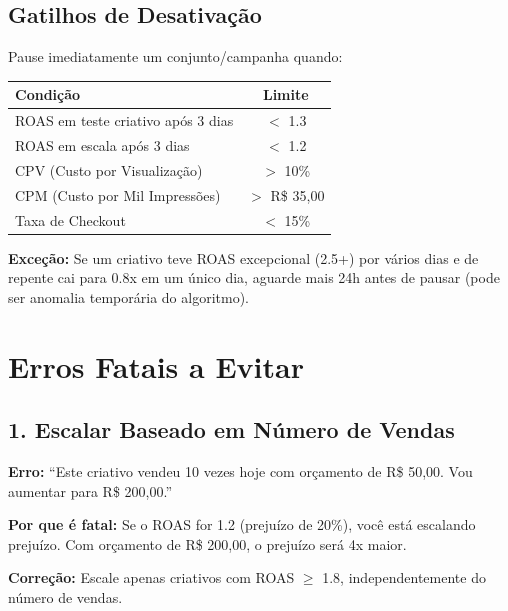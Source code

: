 \documentclass[12pt, a4paper]{article}
\newcommand{\reais}[1]{R\$ #1}
\begin{document}
\pagebreak

\subsection{Gatilhos de Desativação}

Pause imediatamente um conjunto/campanha quando:

\begin{table}[H]
    \centering
    \renewcommand{\arraystretch}{1.4}
    \begin{tabularx}{\textwidth}{X c}
        \toprule
        \rowcolor{tableHeader} \textbf{Condição} & \textbf{Limite} \\
        \midrule
        ROAS em teste criativo após 3 dias & $<$ 1.3 \\
        \rowcolor{lightGray}
        ROAS em escala após 3 dias & $<$ 1.2 \\
        CPV (Custo por Visualização) & $>$ 10\% \\
        \rowcolor{lightGray}
        CPM (Custo por Mil Impressões) & $>$ \reais{35,00} \\
        Taxa de Checkout & $<$ 15\% \\
        \bottomrule
    \end{tabularx}
\end{table}

\textcolor{accentColor}{\textbf{Exceção:}} Se um criativo teve ROAS excepcional (2.5+) por vários dias e de repente cai para 0.8x em um único dia, aguarde mais 24h antes de pausar (pode ser anomalia temporária do algoritmo).

\section{Erros Fatais a Evitar}

\subsection{1. Escalar Baseado em Número de Vendas}

\textbf{Erro:} ``Este criativo vendeu 10 vezes hoje com orçamento de \reais{50,00}. Vou aumentar para \reais{200,00}.''

\textbf{Por que é fatal:} Se o ROAS for 1.2 (prejuízo de 20\%), você está escalando prejuízo. Com orçamento de \reais{200,00}, o prejuízo será 4x maior.

\textbf{Correção:} Escale apenas criativos com ROAS $\geq$ 1.8, independentemente do número de vendas.
\end{document}
